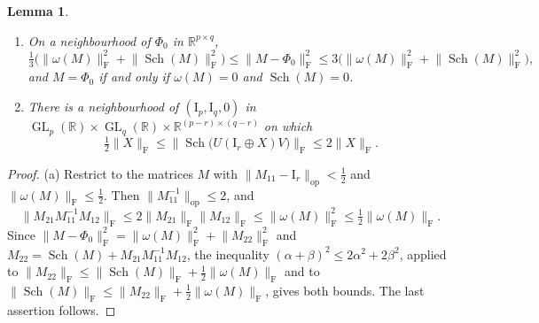 \documentclass[11pt,a4paper]{article}
\newtheorem{lemma}[theorem]{Lemma}
\theoremstyle{definition}
\theoremstyle{remark}
\numberwithin{equation}{section}
\newcommand{\R}{\mathbb{R}}
\newcommand{\GL}{\operatorname{GL}}
\newcommand{\Sch}{\operatorname{Sch}}
\newcommand{\id}{\mathrm{I}}
\newcommand{\Fr}[1]{\lVert #1\rVert_{\mathrm F}}
\newcommand{\norm}[1]{\lVert #1\rVert}
\begin{document}
\begin{lemma}\label{lem:schur}
\begin{enumerate}[label=\textup{(\alph*)}]
\item On a neighbourhood of $\Phi_0$ in $\R^{p\times q}$,
\[
\tfrac13\bigl(\Fr{\omega(M)}^2+\Fr{\Sch(M)}^2\bigr)\le\Fr{M-\Phi_0}^2\le3\bigl(\Fr{\omega(M)}^2+\Fr{\Sch(M)}^2\bigr),
\]
and $M=\Phi_0$ if and only if $\omega(M)=0$ and $\Sch(M)=0$.
\item There is a neighbourhood of $(\id_p,\id_q,0)$ in $\GL_p(\R)\times\GL_q(\R)\times\R^{(p-r)\times(q-r)}$ on which
\[
\tfrac12\Fr X\le\Fr{\Sch\bigl(U(\id_r\oplus X)V\bigr)}\le2\Fr X .
\]
\end{enumerate}
\end{lemma}
\begin{proof}
(a) Restrict to the matrices $M$ with $\norm{M_{11}-\id_r}_{\mathrm{op}}<\frac{1}{2}$ and $\Fr{\omega(M)}\le\frac{1}{2}$. Then $\norm{M_{11}^{-1}}_{\mathrm{op}}\le2$, and
\[
\Fr{M_{21}M_{11}^{-1}M_{12}}\le2\Fr{M_{21}}\Fr{M_{12}}\le\Fr{\omega(M)}^2\le\tfrac12\Fr{\omega(M)}.
\]
Since $\Fr{M-\Phi_0}^2=\Fr{\omega(M)}^2+\Fr{M_{22}}^2$ and $M_{22}=\Sch(M)+M_{21}M_{11}^{-1}M_{12}$, the inequality $(\alpha+\beta)^2\le2\alpha^2+2\beta^2$, applied to $\Fr{M_{22}}\le\Fr{\Sch(M)}+\frac{1}{2}\Fr{\omega(M)}$ and to $\Fr{\Sch(M)}\le\Fr{M_{22}}+\frac{1}{2}\Fr{\omega(M)}$, gives both bounds. The last assertion follows.


\end{proof}
\end{document}

